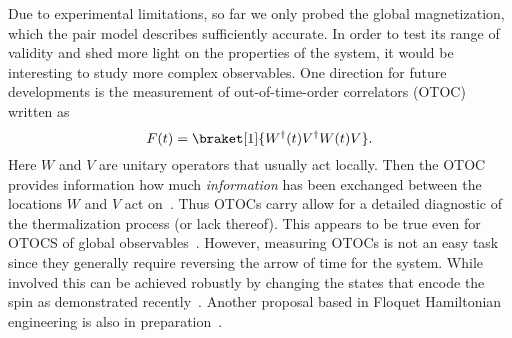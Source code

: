 Due to experimental limitations, so far we only probed the global magnetization, which the pair model describes sufficiently accurate. In order to test its range of validity and shed more light on the properties of the system, it would be interesting to study more complex observables.
One direction for future developments is the measurement of out-of-time-order correlators (OTOC) written as
\begin{equation}
	F(t) = \braket[1]{W^\dagger(t)V^\dagger W(t)V}.
\end{equation}
Here $W$ and $V$ are unitary operators that usually act locally. Then the OTOC provides information how much \emph{information} has been exchanged between the locations $W$ and $V$ act on~\cite{chenOutTimeOrder2017,swingleUnscramblingPhysicsOutoftimeorder2018,luitzEmergentLocalitySystems2019,xuScramblingDynamicsOutofTimeOrdered2024}. Thus OTOCs carry allow for a detailed diagnostic of the thermalization process (or lack thereof). This appears to be true even for OTOCS of global observables~\cite{lozano-negroGlobalOutTime2024}. However, measuring OTOCs is not an easy task since they generally require reversing the arrow of time for the system. While involved this can be achieved robustly by changing the states that encode the spin as demonstrated recently~\cite{geierTimereversalDipolarQuantum2024}. Another proposal based in Floquet Hamiltonian engineering is also in preparation~\cite{muellenbachOTOC}. 

